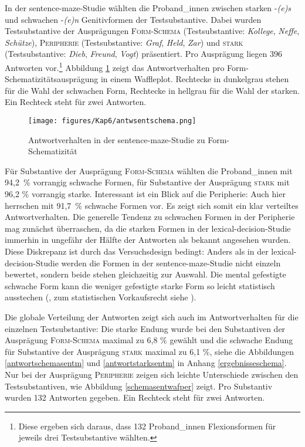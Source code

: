In der sentence-maze-Studie wählten die Proband\_innen zwischen starken -\textit{(e)s}  und schwachen -\textit{(e)n} Genitivformen der Testsubstantive. Dabei wurden Testsubstantive der Ausprägungen \textsc{Form-Schema} (Testsubstantive: \textit{Kollege}, \textit{Neffe}, \textit{Schütze}), \textsc{Peripherie} (Testsubstantive: \textit{Graf}, \textit{Held}, \textit{Zar}) und \textsc{stark} (Testsubstantive: \textit{Dieb}, \textit{Freund}, \textit{Vogt}) präsentiert. Pro Ausprägung liegen 396 Antworten vor.\footnote{Diese ergeben sich daraus, dass 132 Proband\_innen Flexionsformen für jeweils drei Testsubstantive wählten.}  Abbildung \ref{schemasentwaf} zeigt das Antwortverhalten pro Form-Schema\-ti\-zi\-täts\-aus\-prä\-gung in einem Waffleplot. Rechtecke in dunkelgrau stehen für die Wahl der schwachen Form, Rechtecke in hellgrau für die Wahl der starken. Ein Rechteck steht für zwei Antworten.


\begin{figure}
\texttt{[image: figures/Kap6/antwsentschema.png]} 
\caption{Antwortverhalten in der sentence-maze-Studie zu Form-Schematizität}
\label{schemasentwaf}
\end{figure}


Für Substantive der Ausprägung \textsc{Form-Schema} wählten die Proband\_innen mit 94,2~\% vorrangig schwache Formen, für Substantive der Ausprägung \textsc{stark} mit 96,2 \% vorrangig starke. Interessant ist ein Blick auf die Peripherie: Auch hier herrschen mit 91,7~\% schwache Formen vor. Es zeigt sich somit ein klar verteiltes Antwortverhalten. Die generelle Tendenz zu schwachen Formen in der Peripherie mag zunächst überraschen, da die starken Formen in der lexical-decision-Studie immerhin in ungefähr der Hälfte der Antworten als bekannt angesehen wurden. Diese Diskrepanz ist durch das Versuchsdesign bedingt: Anders als in der lexical-decision-Studie werden die Formen in der sentence-maze-Studie nicht einzeln bewertet, sondern beide stehen gleichzeitig zur Auswahl. Die mental gefestigte schwache Form kann die weniger gefestigte starke Form so leicht statistisch ausstechen (\cite[74--94]{Goldberg.2019}, zum statistischen Vorkaufsrecht siehe ).    

 

Die globale Verteilung der Antworten zeigt sich auch im Antwortverhalten für die einzelnen Testsubstantive: Die starke Endung wurde bei den Substantiven der Ausprägung \textsc{Form-Schema} maximal zu 6,8 \% gewählt und die schwache Endung für Substantive der Ausprägung \textsc{stark} maximal zu 6,1 \%, siehe die Abbildungen \ref{antwortschemasentm} und \ref{antwortstarksentm} in Anhang \ref{ergebnisseschema}. Nur bei der Ausprägung \textsc{Peripherie} zeigen sich leichte Unterschiede zwischen den Testsubstantiven, wie Abbildung \ref{schemasentwafper} zeigt. Pro Substantiv wurden 132 Antworten gegeben. Ein Rechteck steht für zwei Antworten.  


